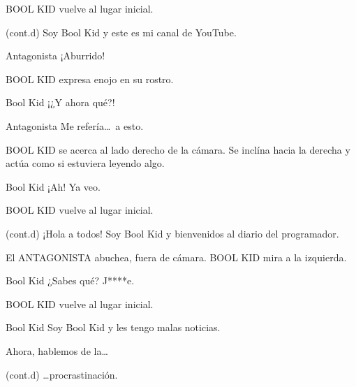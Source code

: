 \documentclass{screenplay}[2018/01/07]
\begin{document}

    BOOL KID vuelve al lugar inicial.

    \begin{dialogue}{(cont.d)}
        Soy Bool Kid y este es mi canal de YouTube.
    \end{dialogue}

    \begin{dialogue}{Antagonista}
        ¡Aburrido!
    \end{dialogue}

    BOOL KID expresa enojo en su rostro.

    \begin{dialogue}{Bool Kid}
        ¡¿Y ahora qué?!
    \end{dialogue}

    \begin{dialogue}{Antagonista}
        Me refería\dots\ a esto.
    \end{dialogue}

    BOOL KID se acerca al lado derecho de la cámara. Se inclína hacia la derecha
    y actúa como si estuviera leyendo algo.

    \begin{dialogue}{Bool Kid}
        ¡Ah! Ya veo.
    \end{dialogue}


    BOOL KID vuelve al lugar inicial.

    \begin{dialogue}{(cont.d)}
        ¡Hola a todos! Soy Bool Kid y bienvenidos al diario del programador.
    \end{dialogue}

    El ANTAGONISTA abuchea, fuera de cámara.
    BOOL KID mira a la izquierda.

    \begin{dialogue}[shouting]{Bool Kid}
        ¿Sabes qué? J****e.
    \end{dialogue}

    BOOL KID vuelve al lugar inicial.

    \begin{dialogue}{Bool Kid}
        Soy Bool Kid y les tengo malas noticias.

        Ahora, hablemos de la\dots
    \end{dialogue}



    \begin{dialogue}{(cont.d)}
        \dots procrastinación.
    \end{dialogue}
    \fadeout

    \theend
\end{document}
